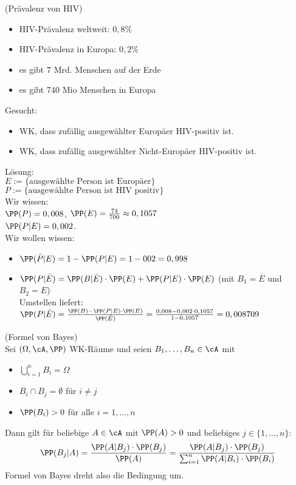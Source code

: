  (Prävalenz von HIV)
\begin{itemize}
\item HIV-Prävalenz weltweit: $0,8\%$
\item HIV-Prävalenz in Europa: $0,2\%$
\item es gibt $7$ Mrd. Menschen auf der Erde
\item es gibt $740$ Mio Menschen in Europa
\end{itemize}
Gesucht:
\begin{itemize}
\item WK, dass zufällig ausgewählter Europäer HIV-positiv ist.
\item WK, dass zufällig ausgewählter Nicht-Europäer HIV-positiv ist.
\end{itemize}
Lösung:\\
$E:=\{\text{ausgewählte Person ist Europäer}\}$\\
$P:=\{\text{ausgewählte Person ist HIV positiv}\}$\\
Wir wissen: \\
$\PP(P)=0,008$, $\PP(E)=\frac{74}{700}\approx 0,1057$\\
$\PP(P|E)=0,002$.\\
Wir wollen wissen:
\begin{itemize}
\item $\PP(\bar P | E)=1-\PP(P|E)=1-002=0,998$
\item $\PP(P | \bar E)=\PP(B|\bar E) \cdot \PP(E)+\PP(P|E) \cdot \PP(E)$ (mit $B_1=\bar E$ und $B_2=E$)\\
Umstellen liefert:\\
$\PP(P|\bar E) = \frac{\PP(B)-\PP(P|E)\cdot\PP(E)}{\PP(\bar E)}=\frac{0,008-0,002\cdot 0,1057}{1-0,1057}=0,008709$
\end{itemize}

 (Formel von Bayes)\\
Sei $(\Omega, \cA, \PP)$ WK-Räume und seien $B_1,\dots,B_n \in \cA$ mit 
\begin{itemize}
\item $\bigcup_{i=1}^n B_i = \Omega$
\item $B_i \cap B_j = \emptyset $ für $i \not= j$
\item $\PP (B_i) >0$ für alle $i=1,\dots,n$
\end{itemize}
Dann gilt für beliebige $A \in \cA$ mit $\PP(A) >0$ und beliebiges $j\in \{1,\dots,n\}$:
$$\PP(B_j|A)=\frac{\PP(A|B_j)\cdot \PP(B_j)}{\PP(A)}=\frac{\PP(A|B_j)\cdot \PP(B_j)}{\sum_{i=1}^n \PP(A|B_i) \cdot \PP(B_i)}$$
Formel von Bayes dreht also die Bedingung um.

